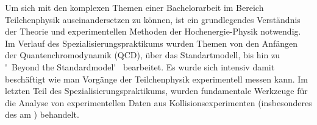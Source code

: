 Um sich mit den komplexen Themen einer Bachelorarbeit im Bereich Teilchenphysik auseinandersetzen zu können, ist ein grundlegendes Verständnis der Theorie und experimentellen Methoden der Hochenergie-Physik notwendig. Im Verlauf des Spezialisierungspraktikums wurden Themen von den Anfängen der Quantenchromodynamik (QCD), über das Standartmodell, bis hin zu \'~Beyond the Standardmodel\'~ bearbeitet. Es wurde sich intensiv damit beschäftigt wie man Vorgänge der Teilchenphysik experimentell messen kann. Im letzten Teil des Spezialisierungspraktikums, wurden fundamentale Werkzeuge für die Analyse von experimentellen Daten aus Kollisionsexperimenten (insbesonderes des \lhc am \cern) behandelt.  